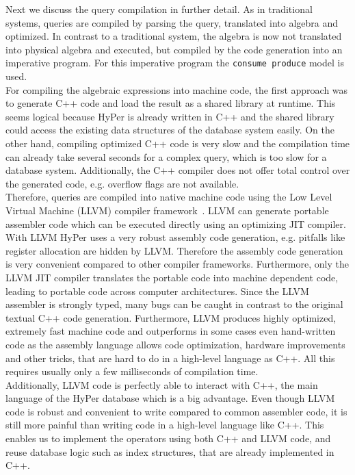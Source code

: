 Next we discuss the query compilation in further detail. As in traditional systems, queries are compiled by parsing the query, translated into algebra and optimized. In contrast to a traditional system, the algebra is now not translated into physical algebra and executed, but compiled by the code generation into an imperative program. For this imperative program the \texttt{consume produce} model is used.
\\
For compiling the algebraic expressions into machine code, the first approach was to generate C++ code and load the result as a shared library at runtime. This seems logical because HyPer is already written in C++ and the shared library could access the existing data structures of the database system easily. On the other hand, compiling optimized C++ code is very slow and the compilation time can already take several seconds for a complex query, which is too slow for a database system. Additionally, the C++ compiler does not offer total control over the generated code, e.g. overflow flags are not available. 
\\
Therefore, queries are compiled into native machine code using the Low Level Virtual Machine (LLVM) compiler framework~\parencite{LLVM}. LLVM can generate portable assembler code which can be executed directly using an optimizing JIT compiler. With LLVM HyPer uses a very robust assembly code generation, e.g. pitfalls like register allocation are hidden by LLVM. Therefore the assembly code generation is very convenient compared to other compiler frameworks. Furthermore, only the LLVM JIT compiler translates the portable code into machine dependent code, leading to portable code across computer architectures. Since the LLVM assembler is strongly typed, many bugs can be caught in contrast to the original textual C++ code generation. Furthermore, LLVM produces highly optimized, extremely fast machine code and outperforms in some cases even hand-written code as the assembly language allows code optimization, hardware improvements and other tricks, that are hard to do in a high-level language as C++. All this requires usually only a few milliseconds of compilation time.
\\
Additionally, LLVM code is perfectly able to interact with C++, the main language of the HyPer database which is a big advantage. Even though LLVM code is robust and convenient to write compared to common assembler code, it is still more painful than writing code in a high-level language like C++. This enables us to implement the operators using both C++ and LLVM code, and reuse database logic such as index structures, that are already implemented in C++. 
